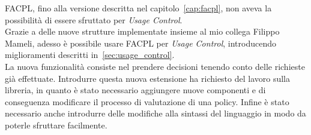 \label{cap:usagecontrolfacpl}
FACPL, fino alla versione descritta nel capitolo~\ref{cap:facpl}, non aveva la possibilità
di essere sfruttato per \textit{Usage Control}.\\
Grazie a delle nuove strutture implementate insieme al mio collega Filippo Mameli, adesso è possibile
usare FACPL per \textit{Usage Control}, introducendo miglioramenti descritti in~\ref{sec:usage_control}.\\
La nuova funzionalità consiste nel prendere decisioni tenendo conto delle richieste già effettuate.
Introdurre questa nuova estensione ha richiesto del lavoro sulla libreria, in quanto è stato necessario aggiungere
nuove componenti e di conseguenza modificare il processo di valutazione di una policy.
Infine è stato necessario anche introdurre delle modifiche alla sintassi del linguaggio in modo da poterle sfruttare 
facilmente.

